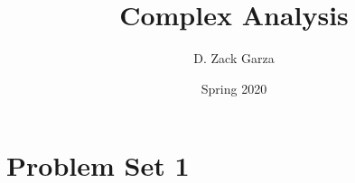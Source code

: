 

\title{Complex Analysis}
\author{D. Zack Garza }
\date{Spring 2020}


\maketitle
\tableofcontents

\section{Problem Set 1}



